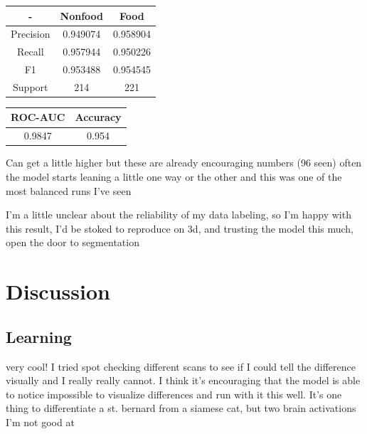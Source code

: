 \documentclass[10pt,twocolumn,letterpaper]{article}
\begin{document}
\begin{center}
 \begin{tabular}{||c c c||}
 \hline
 - & Nonfood & Food \\ [0.5ex]
 \hline\hline
Precision & 0.949074 & 0.958904 \\
 \hline
Recall & 0.957944 & 0.950226 \\
 \hline
F1 & 0.953488 & 0.954545 \\
 \hline
Support & 214 & 221 \\ [1ex]
 \hline
\end{tabular}

\end{center}
\begin{center}
 \begin{tabular}{||c c||}
 \hline
 ROC-AUC & Accuracy \\ [0.5ex]
 \hline\hline
  0.9847 & 0.954 \\ [1ex]
 \hline
\end{tabular}
\end{center}

Can get a little higher but these are already encouraging numbers (96 seen) often the model starts leaning a little
one way or the other and this was one of the most balanced runs I've seen

I'm a little unclear about the reliability of my data labeling, so I'm happy with this result, I'd be stoked
to reproduce on 3d, and trusting the model this much, open the door to segmentation

\section{Discussion}\label{sec:discussion}

\subsection{Learning}\label{subsec:learning}
very cool! I tried spot checking different scans to see if I could tell the difference visually and I really really
cannot. I think it's encouraging that the model is able to notice impossible to visualize differences and run with it
this well. It's one thing to differentiate a st. bernard from a siamese cat, but two brain activations I'm not good at
\end{document}
